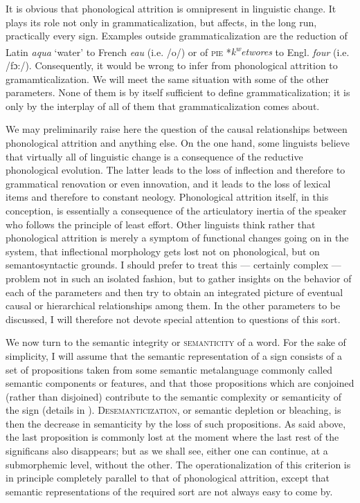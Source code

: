 It is obvious that phonological attrition is omnipresent in linguistic change. It plays its role not only in grammaticalization, but affects, in the long run, practically every sign. Examples outside grammaticalization are the reduction of Latin \textit{aqua} ‘water’ to French \textit{eau} (i.e. /o/) or of \textsc{pie} *\textit{k}\textit{\textsuperscript{w}}\textit{etwores} to Engl. \textit{four} (i.e. /fɔ:/). Consequently, it would be wrong to infer from phonological attrition to gramamticalization. We will meet the same situation with some of the other parameters. None of them is by itself sufficient to define grammaticalization; it is only by the interplay of all of them that grammaticalization comes about.

We may preliminarily raise here the question of the causal relationships between phonological attrition and anything else. On the one hand, some linguists believe that virtually all of linguistic change is a consequence of the reductive phonological evolution. The latter leads to the loss of inflection and therefore to grammatical renovation or even innovation, and it leads to the loss of lexical items and therefore to constant neology. Phonological attrition itself, in this conception, is essentially a consequence of the articulatory inertia of the speaker who follows the principle of least effort. Other linguists think rather that phonological attrition is merely a symptom of functional changes going on in the system, that inflectional morphology gets lost not on phonological, but on semantosyntactic grounds. I should prefer to treat this — certainly complex — problem not in such an isolated fashion, but to gather insights on the behavior of each of the parameters and then try to obtain an integrated picture of eventual causal or hierarchical relationships among them. In the other parameters to be discussed, I will therefore not devote special attention to questions of this sort.

We now turn to the semantic integrity or \textsc{semanticity} of a word. For the sake of simplicity, I will assume that the semantic representation of a sign consists of a set of propositions taken from some semantic metalanguage commonly called semantic components or features, and that those propositions which are conjoined (rather than disjoined) contribute to the semantic complexity or semanticity of the sign (details in \citealt{Lehmann1978}). \textsc{Desemanticization}, or semantic depletion \citep[180f]{Weinreich1963} or bleaching, is then the decrease in semanticity by the loss of such propositions. As said above, the last proposition is commonly lost at the moment where the last rest of the significans also disappears; but as we shall see, either one can continue, at a submorphemic level, without the other. The operationalization of this criterion is in principle completely parallel to that of phonological attrition, except that semantic representations of the required sort are not always easy to come by.

